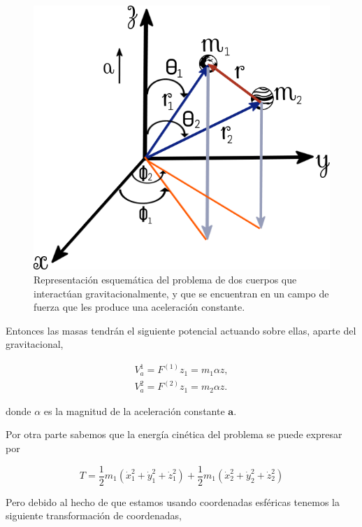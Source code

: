 \documentclass[a4paper,10pt]{article}
\numberwithin{equation}{section}
\begin{document}
\begin{figure}[H]
 \center
 \includegraphics[scale=0.4]{problema1fig1}
 \caption{Representación esquemática del problema de dos cuerpos que interactúan 
 gravitacionalmente, y que se encuentran en un campo de fuerza que les produce una 
 aceleración constante.}
 \label{fig:problema1fig1}
\end{figure}

Entonces las masas tendrán el siguiente potencial actuando sobre ellas, aparte 
del gravitacional,

\begin{align}
 V_{a}^{1} = F^{(1)} z_1 = m_1 \alpha z, \\
 V_{a}^{2} = F^{(2)} z_1 = m_2 \alpha z.
\end{align}

donde $\alpha$ es la magnitud de la aceleración constante $\mathbf{a}$.

\vspace{.3cm}

Por otra parte sabemos que la energía cinética del problema se puede expresar por 

\begin{equation}
 T = \frac{1}{2} m_1 (\dot{x}_1^2 + \dot{y}_1^2 + \dot{z}_1^2) + \frac{1}{2} m_1 (\dot{x}_2^2 + \dot{y}_2^2 + \dot{z}_2^2)
\end{equation}

Pero debido al hecho de que estamos usando coordenadas esféricas tenemos la siguiente 
transformación de coordenadas,
\end{document}
